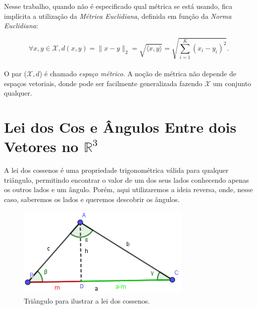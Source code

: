 \documentclass[a4paper,12pt]{article}
\begin{document}
Nesse trabalho, quando não é especificado qual métrica se está usando, fica implícita a utilização da \textit{Métrica Euclidiana}, definida em função da \textit{Norma Euclidiana}:

\begin{equation}\tag{Norma Euclidiana}
\forall x, y \in \mathcal{X}, d(x,y) = \lVert x-y \rVert_2 = \sqrt{\langle x, y\rangle} = \sqrt{\sum_{i = 1}^{K} (x_i-y_i)^2}.
\label{eq:normaEuclidiana}
\end{equation}
\\

O par ($\mathcal{X}, d$) é chamado \textit{espaço métrico}. A noção de métrica não depende de espaços vetoriais, donde pode ser facilmente generalizada fazendo $\mathcal{X}$ um conjunto qualquer.

\section{Lei dos Cos e Ângulos Entre dois Vetores no $\mathbb{R}^3$}
\label{ap:cos}
A lei dos cossenos é uma propriedade trigonométrica válida para qualquer triângulo, permitindo encontrar o valor de um dos seus lados conhecendo apenas os outros lados e um ângulo. Porém, aqui utilizaremos a ideia reversa, onde, nesse caso, saberemos os lados e queremos descobrir os ângulos.
\begin{figure}[H]
	\begin{center}
		\includegraphics[width=0.50\linewidth]{figures/triangulo.png}
	\end{center}
	\caption{Triângulo para ilustrar a lei dos cossenos.}
	\label{fig:coslaw}
\end{figure}
\end{document}

